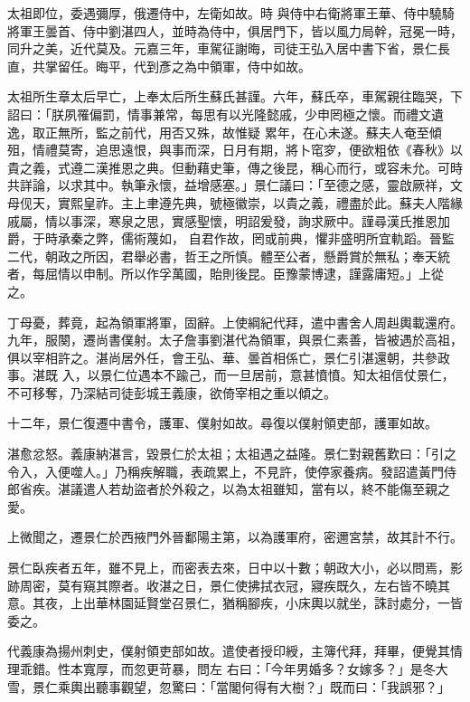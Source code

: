 \begin{pinyinscope}
 太祖即位，委遇彌厚，俄遷侍中，左衛如故。時
 與侍中右衛將軍王華、侍中驍騎將軍王曇首、侍中劉湛四人，並時為侍中，俱居門下，皆以風力局幹，冠冕一時，同升之美，近代莫及。元嘉三年，車駕征謝晦，司徒王弘入居中書下省，景仁長直，共掌留任。晦平，代到彥之為中領軍，侍中如故。



 太祖所生章太后早亡，上奉太后所生蘇氏甚謹。六年，蘇氏卒，車駕親往臨哭，下詔曰：「朕夙罹偏罰，情事兼常，每思有以光隆懿戚，少申罔極之懷。而禮文遺逸，取正無所，監之前代，用否又殊，故惟疑
 累年，在心未遂。蘇夫人奄至傾殂，情禮莫寄，追思遠恨，與事而深，日月有期，將卜窀穸，便欲粗依《春秋》以貴之義，式遵二漢推恩之典。但動藉史筆，傳之後昆，稱心而行，或容未允。可時共詳論，以求其中。執筆永懷，益增感塞。」景仁議曰：「至德之感，靈啟厥祥，文母伣天，實熙皇祚。主上聿遵先典，號極徽崇，以貴之義，禮盡於此。蘇夫人階緣戚屬，情以事深，寒泉之思，實感聖懷，明詔爰發，詢求厥中。謹尋漢氏推恩加爵，于時承秦之弊，儒術蔑如，
 自君作故，罔或前典，懼非盛明所宜軌蹈。晉監二代，朝政之所因，君舉必書，哲王之所慎。體至公者，懸爵賞於無私；奉天統者，每屈情以申制。所以作孚萬國，貽則後昆。臣豫蒙博逮，謹露庸短。」上從之。



 丁母憂，葬竟，起為領軍將軍，固辭。上使綱紀代拜，遣中書舍人周赳輿載還府。九年，服闋，遷尚書僕射。太子詹事劉湛代為領軍，與景仁素善，皆被遇於高祖，俱以宰相許之。湛尚居外任，會王弘、華、曇首相係亡，景仁引湛還朝，共參政事。湛既
 入，以景仁位遇本不踰己，而一旦居前，意甚憤憤。知太祖信仗景仁，不可移奪，乃深結司徒彭城王義康，欲倚宰相之重以傾之。



 十二年，景仁復遷中書令，護軍、僕射如故。尋復以僕射領吏部，護軍如故。



 湛愈忿怒。義康納湛言，毀景仁於太祖；太祖遇之益隆。景仁對親舊歎曰：「引之令入，入便噬人。」乃稱疾解職，表疏累上，不見許，使停家養病。發詔遣黃門侍郎省疾。湛議遣人若劫盜者於外殺之，以為太祖雖知，當有以，終不能傷至親之愛。



 上微聞之，遷景仁於西掖門外晉鄱陽主第，以為護軍府，密邇宮禁，故其計不行。



 景仁臥疾者五年，雖不見上，而密表去來，日中以十數；朝政大小，必以問焉，影跡周密，莫有窺其際者。收湛之日，景仁使拂拭衣冠，寢疾既久，左右皆不曉其意。其夜，上出華林園延賢堂召景仁，猶稱腳疾，小床輿以就坐，誅討處分，一皆委之。



 代義康為揚州刺史，僕射領吏部如故。遣使者授印綬，主簿代拜，拜畢，便覺其情理乖錯。性本寬厚，而忽更苛暴，問左
 右曰：「今年男婚多？女嫁多？」是冬大雪，景仁乘輿出聽事觀望，忽驚曰：「當閣何得有大樹？」既而曰：「我誤邪？」




\end{pinyinscope}
